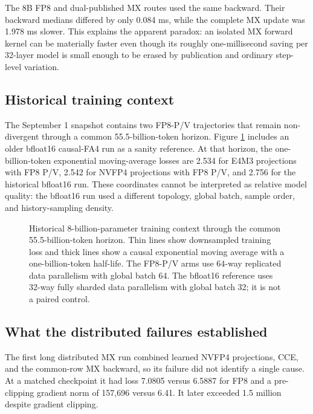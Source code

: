 The 8B FP8 and dual-published MX routes used the same backward.  Their backward
medians differed by only 0.084 ms, while the complete MX update was 1.978 ms
slower.  This explains the apparent paradox: an isolated MX forward kernel can
be materially faster even though its roughly one-millisecond saving per
32-layer model is small enough to be erased by publication and ordinary
step-level variation.

\subsection{Historical training context}

The September 1 snapshot contains two FP8-P/V trajectories that remain
non-divergent through a common 55.5-billion-token horizon.  Figure
\ref{fig:llama8b-training-curves} includes an older bfloat16 causal-FA4 run as
a sanity reference.  At that horizon, the one-billion-token exponential
moving-average losses are 2.534 for E4M3 projections with FP8 P/V, 2.542 for
NVFP4 projections with FP8 P/V, and 2.756 for the historical bfloat16 run.
These coordinates cannot be interpreted as relative model quality: the
bfloat16 run used a different topology, global batch, sample order, and
history-sampling density.

\begin{figure}[H]
\centering
{}
\caption{Historical 8-billion-parameter training context through the common
55.5-billion-token horizon.  Thin lines show downsampled training loss and
thick lines show a causal exponential moving average with a one-billion-token
half-life.  The FP8-P/V arms use 64-way replicated data parallelism with
global batch 64.  The bfloat16 reference uses 32-way fully sharded data
parallelism with global batch 32; it is not a paired control.}
\label{fig:llama8b-training-curves}
\end{figure}

\subsection{What the distributed failures established}

The first long distributed MX run combined learned NVFP4 projections, CCE,
and the common-row MX backward, so its failure did not identify a single
cause.  At a matched checkpoint it had loss 7.0805 versus 6.5887 for FP8 and a
pre-clipping gradient norm of 157,696 versus 6.41.  It later exceeded 1.5
million despite gradient clipping.

